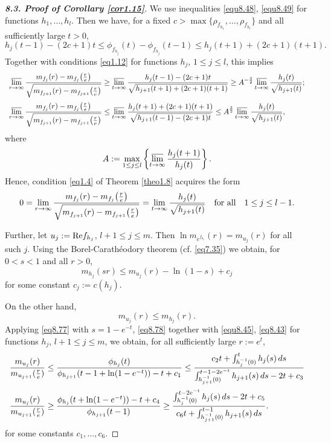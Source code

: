 \documentclass[11pt, oneside]{amsart}
\begin{document}
\begin{proof}[{\bf 8.3. Proof of Corollary \ref{cor1.15}}]
We use inequalities \eqref{equ8.48}, \eqref{equ8.49} for functions
$h_1,\dots, h_l$. Then we have, for a fixed $c>\max\{\rho_{f_{h_1}},\dots,\rho_{f_{h_l}}\}$ and all sufficiently large $t>0$,
\[
h_j(t-1)-(2c+1)t\le\phi_{f_{h_j}}(t)-\phi_{f_{h_j}}(t-1)\le h_j(t+1)+(2c+1)(t+1).
\]
Together with conditions \eqref{eq1.12} for functions $h_j$, $1\le j\le l$, this implies 
\[
\begin{array}{l}
\displaystyle
\varlimsup_{r\rightarrow\infty}\frac{m_{f_j}(r)-m_{f_j}\bigl(\frac re\bigr)}{\sqrt{m_{f_{j+1}}(r)-m_{f_{j+1}}\bigl(\frac{r}{e}\bigr)}}\ge \varlimsup_{t\rightarrow\infty}\frac{h_j(t-1)-(2c+1)t}{\sqrt{h_{j+1}(t+1)+(2c+1)(t+1)}}\ge
A^{-\frac 32}\varlimsup_{t\rightarrow\infty}\frac{h_j(t)}{\sqrt{h_{j+1}(t)}};\medskip\\
\displaystyle
\varlimsup_{r\rightarrow\infty}\frac{m_{f_j}(r)-m_{f_j}\bigl(\frac re\bigr)}{\sqrt{m_{f_{j+1}}(r)-m_{f_{j+1}}\bigl(\frac{r}{e}\bigr)}}\le \varlimsup_{t\rightarrow\infty}\frac{h_j(t+1)+(2c+1)(t+1)}{\sqrt{h_{j+1}(t-1)-(2c+1)t}}\le
A^{\frac 32}\varlimsup_{t\rightarrow\infty}\frac{h_j(t)}{\sqrt{h_{j+1}(t)}},
\end{array}
\]
where 
\[
A:=\max_{1\le j\le l}\left\{\varlimsup_{t\rightarrow\infty}\frac{h_j(t+1)}{h_j(t)}\right\}.
\]
Hence, condition \eqref{eq1.4} of Theorem \ref{theo1.8} acquires the form
\[
0=\lim_{r\rightarrow\infty}\frac{m_{f_j}(r)-m_{f_j}\bigl(\frac re\bigr)}{\sqrt{m_{f_{j+1}}(r)-m_{f_{j+1}}\bigl(\frac{r}{e}\bigr)}}=\lim_{t\rightarrow\infty}\frac{h_j(t)}{\sqrt{h_{j+1}(t)}}\quad {\rm for\ all}\quad 1\le j\le l-1.
\]

Further, let $u_j:={\rm Re} f_{h_j}$, $l+1\le j\le m$.
Then $\ln m_{e^{f_{h_j}}}(r)=m_{u_j}(r)$ for all such $ j$. Using the Borel-Carath\'eodory theorem (cf. \eqref{eq7.35}) we obtain, for $0<s<1$ and all $r>0$,
\begin{equation}\label{eq8.77}
m_{h_j}(sr)\le m_{u_j}(r)-\ln(1-s)+c_j
\end{equation}
for some constant $c_j:=c(h_j)$.

On the other hand,
\begin{equation}\label{eq8.78}
m_{u_j}(r)\le m_{h_j}(r).
\end{equation}
Applying \eqref{eq8.77} with $s=1-e^{-t}$, \eqref{eq8.78} together with \eqref{equ8.45}, \eqref{eq8.43} for functions $h_j$, $l+1\le j\le m$, we obtain, for all sufficiently large $r:=e^t$,\smallskip
\begin{equation}\label{eq8.79}
\begin{array}{l}
\displaystyle \frac{m_{u_j}(r)}{m_{u_{j+1}}(\frac re)}\le \frac{\phi_{h_j}(t)}{\phi_{h_{j+1}}(t-1+\ln(1-e^{-t}))-t+c_1}\le \frac{c_2t+\int_{h_j^{-1}(0)}^t h_j(s)\,ds}{\int_{h_{j+1}^{-1}(0)}^{t-1-2e^{-t}} h_{j+1}(s)\,ds -2t+c_3}\medskip\\
\displaystyle  \frac{m_{u_j}(r)}{m_{u_{j+1}}(\frac re)}\ge\frac{\phi_{h_j}(t+\ln(1-e^{-t}))-t+c_4}{\phi_{h_{j+1}}(t-1)}\ge\frac{\int_{h_{j}^{-1}(0)}^{t-2e^{-t}} h_{j}(s)\,ds-2t+c_5}{c_6t+\int_{h_{j+1}^{-1}(0)}^{t-1} h_{j+1}(s)\,ds}.
\end{array}
\end{equation}
for some constants $c_1,\dots, c_6$.


\end{proof}
\end{document}
